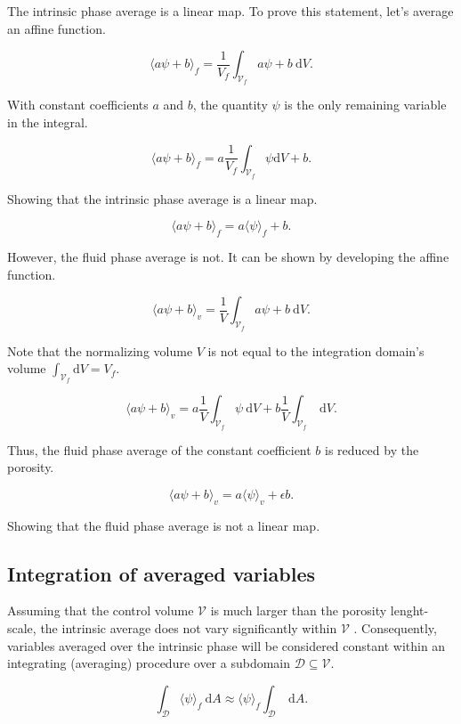 \documentclass[a4paper,11pt]{article}
\begin{document}
The intrinsic phase average is a linear map. To prove this statement, let's average an affine function.

$$\langle a\psi + b\rangle_f = \frac{1}{V_f}\int_{\mathcal V_f}a\psi+b~\mathrm dV.$$

With constant coefficients $a$ and $b$, the quantity $\psi$ is the only remaining variable in the integral.

$$\langle a\psi + b\rangle_f = a \frac{1}{V_f}\int_{\mathcal V_f}\psi\mathrm dV + b.$$

Showing that the intrinsic phase average is a linear map.

$$\langle a\psi + b\rangle_f = a\langle\psi\rangle_f+b.$$

However, the fluid phase average is not.
It can be shown by developing the affine function.

$$\langle a\psi+b\rangle_v = \frac{1}{V}\int_{\mathcal V_f} a\psi+b~\mathrm dV.$$

Note that the normalizing volume $V$ is not equal to the integration domain's volume $\int_{\mathcal V_f}\mathrm dV=V_f$.

$$\langle a\psi+b\rangle_v = a\frac{1}{V}\int_{\mathcal V_f} \psi~\mathrm dV + b\frac{1}{V}\int_{\mathcal V_f}~\mathrm dV.$$

Thus, the fluid phase average of the constant coefficient $b$ is reduced by the porosity.

$$\langle a\psi+b\rangle_v = a\langle\psi\rangle_v+\epsilon b.$$

Showing that the fluid phase average is not a linear map.

\subsection{Integration of averaged variables}

Assuming that the control volume $\mathcal V$ is much larger than the porosity lenght-scale, the intrinsic average does not vary significantly within $\mathcal V$ \citep{Carbonell1984}.
Consequently, variables averaged over the intrinsic phase will be considered constant within an integrating (averaging) procedure over a subdomain $\mathcal D\subseteq\mathcal V$.

\begin{equation}\label{eq:integrate-average}
  \boxed{\int_{\mathcal D}\langle\psi\rangle_f~\mathrm dA\approx\langle\psi\rangle_f\int_{\mathcal D}~\mathrm dA.}
\end{equation}
\end{document}
